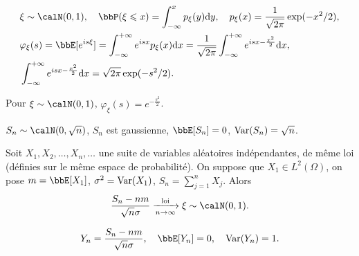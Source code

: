 \begin{exem}
    \begin{align*}
         & \xi \sim \calN(0, 1), \quad \bbP(\xi \leqslant x) = \int_{-\infty}^x p_{\xi}(y) \dif y,
        \quad p_{\xi}(x) = \frac{1}{\sqrt{2\pi}} \exp(-x^2/2),                                     \\
         & \varphi_{\xi}(s) = \bbE[e^{is\xi}] = \int_{-\infty}^{+\infty} e^{isx} p_{\xi}(x) \dif x
        = \frac{1}{\sqrt{2\pi}} \int_{-\infty}^{+\infty} e^{isx - \frac{x^2}{2}} \dif x,           \\
         & \int_{-\infty}^{+\infty} e^{isx - \frac{x^2}{2}} \dif x = \sqrt{2\pi} \exp(-s^2/2).
    \end{align*}
\end{exem}

\begin{lem}
    Pour $\xi \sim \calN(0,1)$, $\varphi_{\xi}(s) = e^{-\frac{s^2}{2}}$.
\end{lem}

\begin{prop}
    $S_n \sim \calN(0, \sqrt{n})$, $S_n$ est gaussienne, $\bbE[S_n] = 0$, $\operatorname{Var}(S_n) = \sqrt{n}$.
\end{prop}

\begin{thm}
    Soit $X_1, X_2, \ldots, X_n, \ldots$ une suite de variables aléatoires indépendantes, de même loi
    (définies sur le même espace de probabilité).
    On suppose que $X_1 \in L^2(\Omega)$,
    on pose $m = \bbE[X_1]$, $\sigma^2 = \operatorname{Var}(X_1)$, $S_n = \sum_{j = 1}^n X_j$. Alors
    \[ \frac{S_n - nm}{\sqrt{n} \sigma} \xrightarrow[n \to \infty]{\text{loi}} \xi \sim \calN(0, 1). \]
\end{thm}

\begin{rqq}
    \[ Y_n = \frac{S_n - nm}{\sqrt{n} \sigma}, \quad \bbE[Y_n] = 0, \quad \var(Y_n) = 1. \]
\end{rqq}

